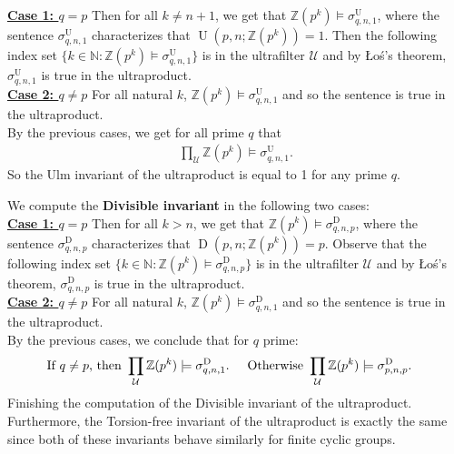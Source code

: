 \documentclass[11pt]{amsart}
\theoremstyle{definition}
\newcommand{\Los}{\L o\'s}
\newcommand{\U}{\mathcal{U}}
\begin{document}
\underline{\textbf{Case 1: $q=p$}} Then for all $k\neq n+1$, we get that $\mathbb{Z}(p^{k})\models \sigma_{q,n,1}^{\operatorname{U}}$, where the sentence $\sigma_{q,n,1}^{\operatorname{U}}$ characterizes that $\operatorname{U}(p,n; \mathbb{Z}(p^{k}))=1$. Then the following index set $\{k\in\mathbb{N}:\mathbb{Z}(p^{k})\models \sigma_{q,n,1}^{\operatorname{U}}\}$ is in the ultrafilter $\U$ and by \Los's theorem, $\sigma_{q,n,1}^{\operatorname{U}}$ is true in the ultraproduct.\\

\underline{\textbf{Case 2: $q\neq p$}} For all natural $k$, $\mathbb{Z}(p^{k})\models \sigma_{q,n,1}^{\operatorname{U}}$ and so the sentence is true in the ultraproduct.\\

\noindent By the previous cases, we get for all prime $q$ that
\begin{align*}
    \prod\limits_{\mathcal{U}} \mathbb{Z}(p^{k})\models \sigma_{q,n,1}^{\operatorname{U}}. 
\end{align*}
So the Ulm invariant of the ultraproduct is equal to 1 for any prime $q$.

\item We compute the \textbf{Divisible invariant} in the following two cases:\\

\underline{\textbf{Case 1: $q=p$}} Then for all $k> n$, we get that $\mathbb{Z}(p^{k})\models \sigma_{q,n,p}^{\operatorname{D}}$, where the sentence $\sigma_{q,n,p}^{\operatorname{D}}$ characterizes that $\operatorname{D}(p,n; \mathbb{Z}(p^{k}))=p$. Observe that the following index set $\{k\in\mathbb{N}:\mathbb{Z}(p^{k})\models \sigma_{q,n,p}^{\operatorname{D}}\}$ is in the ultrafilter $\U$ and by \Los's theorem, $\sigma_{q,n,p}^{\operatorname{D}}$ is true in the ultraproduct.\\

\underline{\textbf{Case 2: $q\neq p$}} For all natural $k$, $\mathbb{Z}(p^{k})\models \sigma_{q,n,1}^{\operatorname{D}}$ and so the sentence is true in the ultraproduct.\\

\noindent By the previous cases, we conclude that for $q$ prime:
\begin{align*}
    &\text{If $q\neq p$, then }\prod\limits_{\mathcal{U}} \mathbb{Z}(p^{k})\models \sigma_{q,n,1}^{\operatorname{D}}.\hspace{0.5cm}\text{Otherwise }\prod\limits_{\mathcal{U}} \mathbb{Z}(p^{k})\models \sigma_{p,n,p}^{\operatorname{D}}. 
\end{align*}
Finishing the computation of the Divisible invariant of the ultraproduct. Furthermore, the Torsion-free invariant of the ultraproduct is exactly the same since both of these invariants behave similarly for finite cyclic groups.
\end{document}
